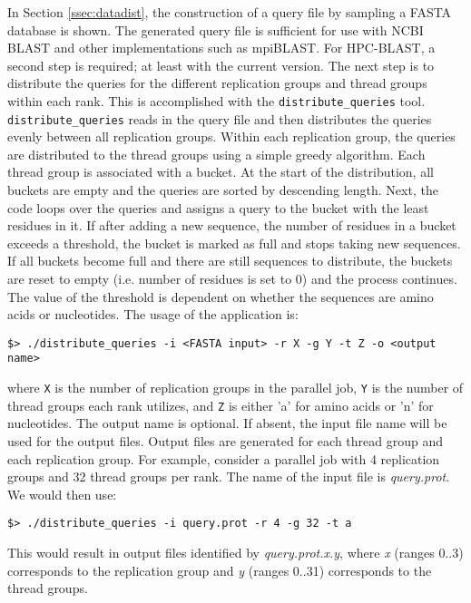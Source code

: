 \documentclass[10pt]{article}
\begin{document}
In Section \ref{ssec:datadist}, the construction of a query file by sampling a FASTA database is shown.  The generated query file is sufficient for use with NCBI BLAST and other implementations such as mpiBLAST.  For HPC-BLAST, a second step is required; at
least with the current version.  The next step is to distribute the queries for the different replication groups and thread groups within each rank.  This is accomplished with the \verb^distribute_queries^ tool.  \verb^distribute_queries^ reads in the query file and then distributes
the queries evenly between all replication groups.  Within each replication group, the queries are distributed to the thread groups using a simple greedy algorithm.  Each thread group is associated with a bucket.  At the start of the distribution, all buckets are empty and
the queries are sorted by descending length.  Next, the code loops over the queries and assigns a query to the bucket with the least residues in it.  If after adding a new sequence, the number of residues in a bucket exceeds a threshold, the bucket is marked as full
and stops taking new sequences.  If all buckets become full and there are still sequences to distribute, the buckets are reset to empty (i.e. number of residues is set to 0) and the process continues.  The value of the threshold is dependent on whether the
sequences are amino acids or nucleotides.  The usage of the application is:
\begin{verbatim}
$> ./distribute_queries -i <FASTA input> -r X -g Y -t Z -o <output name>
\end{verbatim}
\noindent where \verb^X^ is the number of replication groups in the parallel job, \verb^Y^ is the number of thread groups each rank utilizes, and \verb^Z^ is either 'a' for amino acids or 'n' for nucleotides.  The output name is optional.  If absent, the input file name
will be used for the output files.  Output files are generated for each thread group and each replication group.  For example, consider a parallel job with 4 replication groups and 32 thread groups per rank.  The name of the input file is \emph{query.prot}. 
We would then use:
\begin{verbatim}
$> ./distribute_queries -i query.prot -r 4 -g 32 -t a
\end{verbatim}
\noindent This would result in output files identified by \emph{query.prot.x.y}, where \emph{x} (ranges 0..3) corresponds to the replication group and \emph{y} (ranges 0..31) corresponds to the thread groups.\\
\end{document}
